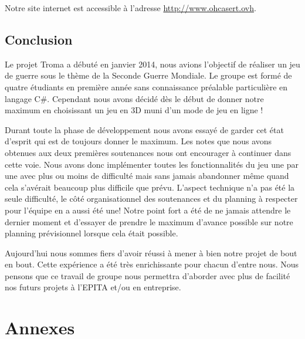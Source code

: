 \documentclass[11pt]{report}
\begin{document}
Notre site internet est accessible à l'adresse \url{http://www.ohcasert.ovh}.

\chapter{Conclusion}

Le projet Troma a débuté en janvier 2014, nous avions l'objectif de réaliser un jeu de guerre sous le thème de la Seconde Guerre Mondiale. Le groupe est formé de quatre étudiants en première année sans connaissance préalable particulière en langage C\#. Cependant nous avons décidé dès le début de donner notre maximum en choisissant un jeu en 3D muni d'un mode de jeu en ligne ! 

Durant toute la phase de développement nous avons essayé de garder cet état d'esprit qui est de toujours donner le maximum. Les notes que nous avons obtenues aux deux premières soutenances nous ont encourager à continuer dans cette voie. Nous avons donc implémenter toutes les fonctionnalités du jeu une par une avec plus ou moins de difficulté mais sans jamais abandonner même quand cela s'avérait beaucoup plus difficile que prévu. L'aspect technique n'a pas été la seule difficulté, le côté organisationnel des soutenances et du planning à respecter pour l'équipe en a aussi été une! Notre point fort a été de ne jamais attendre le dernier moment et d'essayer de prendre le maximum d'avance possible sur notre planning prévisionnel lorsque cela était possible.

Aujourd'hui nous sommes fiers d'avoir réussi à mener à bien notre projet de bout en bout. Cette expérience a été très enrichissante pour chacun d'entre nous. Nous pensons que ce travail de groupe nous permettra d'aborder avec plus de facilité nos futurs projets à l'EPITA et/ou en entreprise.

\newpage
{}
\part*{Annexes}

\newpage
\listoffigures

\newpage
\tableofcontents
 
\end{document}
